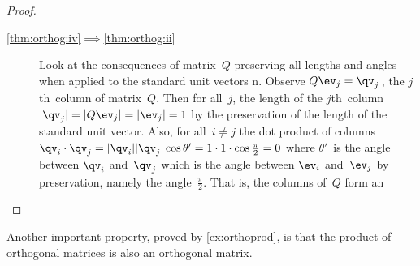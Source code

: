 \begin{proof}
\begin{description}
\item[\ref{thm:orthog:iv}$\implies$\ref{thm:orthog:ii}]
Look at the consequences of matrix~\(Q\) preserving all lengths and angles when applied to the standard unit vectors \hlist\ev n.
Observe \(Q\ev_j=\qv_j\)\,, the \(j\)th~column of matrix~\(Q\).
Then for all~\(j\), the length of the \(j\)th~column \(|\qv_j|=|Q\ev_j|=|\ev_j|=1\) by the preservation of the length of the standard unit vector.
Also, for all~\(i\neq j\) the dot product of columns \(\qv_i\cdot\qv_j=|\qv_i||\qv_j|\cos\theta'=1\cdot1\cdot\cos\frac\pi2=0\) where \(\theta'\)~is the angle between \(\qv_i\) and~\(\qv_j\) which is the angle between \(\ev_i\) and~\(\ev_j\) by preservation, namely the angle~\(\frac\pi2\).
That is, the columns of~\(Q\) form an 

\end{description}
\end{proof}


Another important property,  proved by \cref{ex:orthoprod}, is that the product of orthogonal matrices is also an orthogonal matrix.

